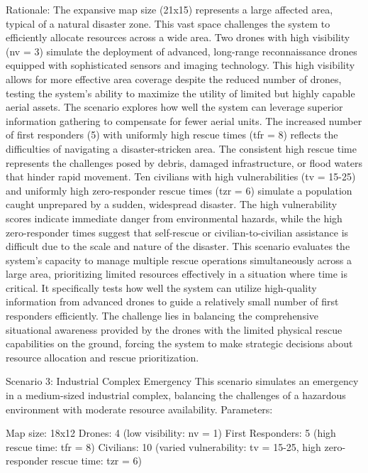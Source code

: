 Rationale:
The expansive map size (21x15) represents a large affected area, typical of a natural disaster zone. This vast space challenges the system to efficiently allocate resources across a wide area.
Two drones with high visibility (nv = 3) simulate the deployment of advanced, long-range reconnaissance drones equipped with sophisticated sensors and imaging technology. This high visibility allows for more effective area coverage despite the reduced number of drones, testing the system's ability to maximize the utility of limited but highly capable aerial assets. The scenario explores how well the system can leverage superior information gathering to compensate for fewer aerial units.
The increased number of first responders (5) with uniformly high rescue times (tfr = 8) reflects the difficulties of navigating a disaster-stricken area. The consistent high rescue time represents the challenges posed by debris, damaged infrastructure, or flood waters that hinder rapid movement.
Ten civilians with high vulnerabilities (tv = 15-25) and uniformly high zero-responder rescue times (tzr = 6) simulate a population caught unprepared by a sudden, widespread disaster. The high vulnerability scores indicate immediate danger from environmental hazards, while the high zero-responder times suggest that self-rescue or civilian-to-civilian assistance is difficult due to the scale and nature of the disaster.
This scenario evaluates the system's capacity to manage multiple rescue operations simultaneously across a large area, prioritizing limited resources effectively in a situation where time is critical. It specifically tests how well the system can utilize high-quality information from advanced drones to guide a relatively small number of first responders efficiently. The challenge lies in balancing the comprehensive situational awareness provided by the drones with the limited physical rescue capabilities on the ground, forcing the system to make strategic decisions about resource allocation and rescue prioritization.

Scenario 3: Industrial Complex Emergency
This scenario simulates an emergency in a medium-sized industrial complex, balancing the challenges of a hazardous environment with moderate resource availability.
Parameters:

Map size: 18x12
Drones: 4 (low visibility: nv = 1)
First Responders: 5 (high rescue time: tfr = 8)
Civilians: 10 (varied vulnerability: tv = 15-25, high zero-responder rescue time: tzr = 6)

